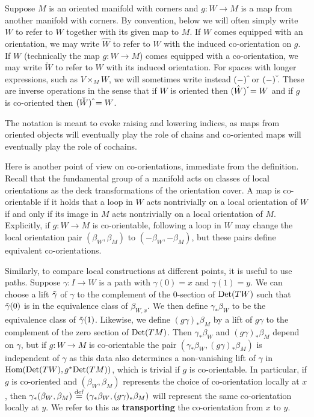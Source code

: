 \begin{notation}\label{N: hat check}
	Suppose $M$ is an oriented manifold with corners and $g \colon W \to M$ is a map from another manifold with corners.
	By convention, below we will often simply write $W$ to refer to $W$ together with its given map to $M$.
	If $W$ comes equipped with an orientation, we may write $\hat W$ to refer to $W$ with the induced co-orientation on $g$.
	If $W$ (technically the map $g \colon W \to M$) comes equipped with a co-orientation, we may write $\check W$ to refer to $W$ with its induced orientation.
	For spaces with longer expressions, such as $V \times_M W$, we will sometimes write instead $(-)\,\hat{\vrule height1.3ex width0pt}$ or $(-)\,\check{\vrule height1.3ex width0pt}$.
	These are inverse operations in the sense that if $W$ is oriented then $(\hat W)\,\check{\vrule height1.3ex width0pt} = W$ and if $g$ is co-oriented then  $(\check W)\,\hat{\vrule height1.3ex width0pt} = W$.

	The notation is meant to evoke raising and lowering indices, as maps from oriented objects will eventually play the role of chains and co-oriented maps will eventually play the role of cochains.
\end{notation}

Here is another point of view on co-orientations, immediate from the definition.
Recall that the fundamental group of a manifold acts on classes of local orientations as the deck transformations of the orientation cover.
A map is co-orientable if it holds that a loop in $W$ acts nontrivially on a local orientation of $W$ if and only if its image in $M$ acts nontrivially on a local orientation of $M$.
Explicitly, if $g \colon W \to M$ is co-orientable, following a loop in $W$ may change the local orientation pair
$(\beta_W, \beta_M)$ to $(-\beta_W, -\beta_M)$, but these pairs define equivalent co-orientations.

Similarly, to compare local constructions at different points, it is useful to use paths.
Suppose $\gamma \colon I \to W$ is a path with $\gamma(0) = x$ and $\gamma(1) = y$.
We can choose a lift $\tilde \gamma$ of $\gamma$ to the complement of the $0$-section of ${\rm Det}(TW)$ such that $\tilde \gamma(0)$ is in the equivalence class of $\beta_{W,x}$.
We then define $\gamma_*\beta_{W}$ to be the equivalence class of $\tilde \gamma(1)$.
Likewise, we define $(g\gamma)_*\beta_M$ by a lift of $g\gamma$ to the complement of the zero section of ${\rm Det}(TM)$.
Then $\gamma_*\beta_{W}$ and $(g\gamma)_*\beta_M$ depend on $\gamma$, but if $g \colon W \to M$ is co-orientable the pair $(\gamma_*\beta_{W}, (g\gamma)_*\beta_M)$ is independent of $\gamma$ as this data also determines a non-vanishing lift of $\gamma$ in $\textup{Hom}({\rm Det}(TW),g^*{\rm Det}(TM))$, which is trivial if $g$ is co-orientable.
In particular, if $g$ is co-oriented and $(\beta_{W}, \beta_M)$ represents the choice of co-orientation locally at $x$, then $\gamma_*(\beta_W,\beta_M) \stackrel{\mathrm{def}}{=} (\gamma_*\beta_{W}, (g\gamma)_*\beta_M)$ will represent the same co-orientation locally at $y$.
We refer to this as \textbf{transporting} the co-orientation from $x$ to $y$.

